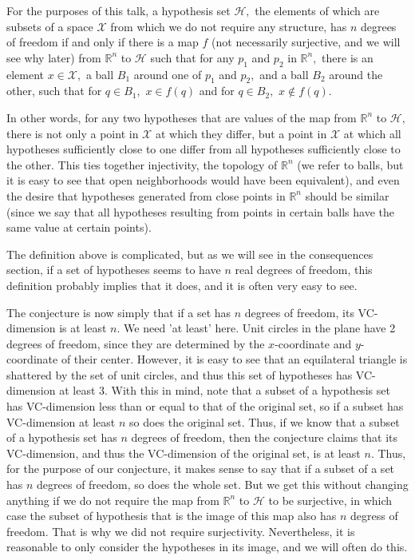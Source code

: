 \documentclass{article}
\begin{document}
For the purposes of this talk, a hypothesis set $\mathcal{H},$ the elements of which are subsets of a space $\mathcal{X}$ from which we do not require any structure, has $n$ degrees of freedom if and only if there is a map $f$ (not necessarily surjective, and we will see why later) from $\mathbb{R}^n$ to $\mathcal{H}$ such that for any $p_1$ and $p_2$ in $\mathbb{R}^n,$ there is an element $x \in \mathcal{X},$ a ball $B_1$ around one of $p_1$ and $p_2,$ and a ball $B_2$ around the other, such that for $q \in B_1,$ $x \in f(q)$ and for $q \in B_2,$ $x \notin f(q).$

In other words, for any two hypotheses that are values of the map from $\mathbb{R}^n$ to $\mathcal{H},$ there is not only a point in $\mathcal{X}$ at which they differ, but a point in $\mathcal{X}$ at which all hypotheses sufficiently close to one differ from all hypotheses sufficiently close to the other. This ties together injectivity, the topology of $\mathbb{R}^n$ (we refer to balls, but it is easy to see that open neighborhoods would have been equivalent), and even the desire that hypotheses generated from close points in $\mathbb{R}^n$ should be similar (since we say that all hypotheses resulting from points in certain balls have the same value at certain points).

The definition above is complicated, but as we will see in the consequences section, if a set of hypotheses seems to have $n$ real degrees of freedom, this definition probably implies that it does, and it is often very easy to see.

The conjecture is now simply that if a set has $n$ degrees of freedom, its VC-dimension is at least $n.$ We need 'at least' here. Unit circles in the plane have 2 degrees of freedom, since they are determined by the $x$-coordinate and $y$-coordinate of their center. However, it is easy to see that an equilateral triangle is shattered by the set of unit circles, and thus this set of hypotheses has VC-dimension at least 3. With this in mind, note that a subset of a hypothesis set has VC-dimension less than or equal to that of the original set, so if a subset has VC-dimension at least $n$ so does the original set. Thus, if we know that a subset of a hypothesis set has $n$ degrees of freedom, then the conjecture claims that its VC-dimension, and thus the VC-dimension of the original set, is at least $n.$ Thus, for the purpose of our conjecture, it makes sense to say that if a subset of a set has $n$ degrees of freedom, so does the whole set. But we get this without changing anything if we do not require the map from $\mathbb{R}^n$ to $\mathcal{H}$ to be surjective, in which case the subset of hypothesis that is the image of this map also has $n$ degress of freedom. That is why we did not require surjectivity. Nevertheless, it is reasonable to only consider the hypotheses in its image, and we will often do this.
\end{document}

